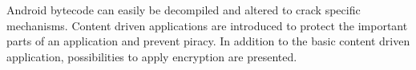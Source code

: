 Android bytecode can easily be decompiled and altered to crack specific mechanisms.
Content driven applications are introduced to protect the important parts of an application and prevent piracy.
\newline
In addition to the basic content driven application, possibilities to apply encryption are presented.
